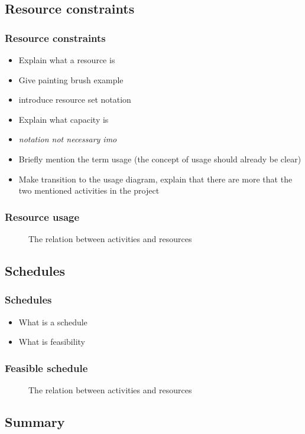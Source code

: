 \documentclass{beamer}
\theoremstyle{definition}
\newcommand{\inputtikz}[1]{}
\newcommand{\mick}[1]{{\color{red}\emph{#1}}}
\begin{document}
\subsection{Resource constraints}
\begin{frame}
	\frametitle{Resource constraints}
	\begin{itemize}
		\item Explain what a resource is
		\item Give painting brush example
		\item introduce resource set notation
		\item Explain what capacity is
		\item \mick{notation not necessary imo}
		\item Briefly mention the term usage (the concept of usage should already be clear)
		\item Make transition to the usage diagram, explain that there are more that the two mentioned activities in the project
	\end{itemize}
\end{frame}
	
\begin{frame}
	\frametitle{Resource usage}
	\vspace{-.2em}
	\begin{figure}[ht]
		\makebox[\textwidth][c]{\resizebox{.7\paperwidth}{!}{
			\inputtikz{usage}
		}}
		\vspace{-1em}
		\caption{The relation between activities and resources}
		\label{fig:activity_graph}
	\end{figure}
\end{frame}

\subsection{Schedules}
\begin{frame}
	\frametitle{Schedules}
	\begin{itemize}
		\item What is a schedule
		\item What is feasibility
	\end{itemize}
\end{frame}

\begin{frame}
	\frametitle{Feasible schedule}
	\vspace{-1em}
	\begin{figure}[ht]
		\makebox[\textwidth][c]{\resizebox{.38\paperwidth}{!}{
			\inputtikz{schedule_feasible_profile}
		}}
		\vspace{-1.2em}
		\caption{The relation between activities and resources}
		\label{fig:activity_graph}
	\end{figure}
\end{frame}

\subsection{Summary}
\end{document}
